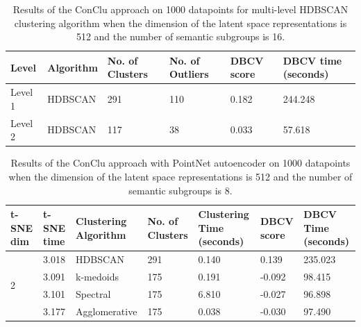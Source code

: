 \begin{table}[H]
  \setlength\extrarowheight{10pt}
  \caption{Results of the ConClu approach on 1000 datapoints for multi-level \ac{HDBSCAN} clustering algorithm when the dimension of the latent space representations is 512 and the number of semantic subgroups is 16. }
  \centering
  \begin{tabular}{|l|l|l|l|l|l|}
    \toprule
    Level & Algorithm	& No. of Clusters	& No. of Outliers	& DBCV score	& \ac{DBCV} time (seconds)	\\  
    \midrule
    Level 1 & \ac{HDBSCAN} & 291	& 110	& 0.182	& 244.248 \\ \cline{1-6}
    Level 2 & \ac{HDBSCAN}	& 117	& 38	& 0.033	& 57.618
    \\ 
    \bottomrule
  \end{tabular}
  \label{tab:conclu_k_16_levels}
\end{table}

\begin{table}[H]
  \setlength\extrarowheight{10pt}
  \caption{Results of the ConClu approach with PointNet autoencoder on 1000 datapoints when the dimension of the latent space representations is 512 and the number of semantic subgroups is 8. }
  \centering
  \begin{tabular}{|p{30pt}|p{50pt}|p{60pt}|p{50pt}|p{50pt}|p{50pt}|p{40pt}|}
    \toprule
    \ac{t-SNE} dim	& \ac{t-SNE} time & Clustering Algorithm & No. of Clusters & Clustering Time (seconds) & \ac{DBCV} score & \ac{DBCV} Time (seconds)\\
    \midrule
    \multirow{4}{30pt}{2}	& 3.018 & \ac{HDBSCAN}	& 291	& 0.140 & 0.139 	& 235.023 \\ \cline{2-7} 
    & 3.091 & k-medoids	& 175	& 0.191 & -0.092	& 98.415 \\ \cline{2-7} 
    & 3.101 & Spectral	& 175	& 6.810 & -0.027	& 96.898 \\ \cline{2-7}
    & 3.177 & Agglomerative	& 175	& 0.038 & -0.030	& 97.490 \\ 
    \bottomrule
  \end{tabular}
  \label{tab:conclu_k_8}
\end{table}

